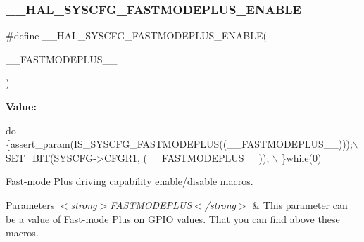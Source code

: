 \subsubsection{\texorpdfstring{\+\_\+\+\_\+\+H\+A\+L\+\_\+\+S\+Y\+S\+C\+F\+G\+\_\+\+F\+A\+S\+T\+M\+O\+D\+E\+P\+L\+U\+S\+\_\+\+E\+N\+A\+B\+LE}{\_\_HAL\_SYSCFG\_FASTMODEPLUS\_ENABLE}}
{\footnotesize\ttfamily \#define \+\_\+\+\_\+\+H\+A\+L\+\_\+\+S\+Y\+S\+C\+F\+G\+\_\+\+F\+A\+S\+T\+M\+O\+D\+E\+P\+L\+U\+S\+\_\+\+E\+N\+A\+B\+LE(\begin{DoxyParamCaption}\item[{}]{\+\_\+\+\_\+\+F\+A\+S\+T\+M\+O\+D\+E\+P\+L\+U\+S\+\_\+\+\_\+ }\end{DoxyParamCaption})}

{\bfseries Value\+:}
\begin{DoxyCode}
\textcolor{keywordflow}{do} \{assert\_param(IS\_SYSCFG\_FASTMODEPLUS((\_\_FASTMODEPLUS\_\_)));\(\backslash\)
                                                                SET\_BIT(SYSCFG->CFGR1, (\_\_FASTMODEPLUS\_\_));
      \(\backslash\)
                                                               \}\textcolor{keywordflow}{while}(0)
\end{DoxyCode}


Fast-\/mode Plus driving capability enable/disable macros. 


\begin{DoxyParams}{Parameters}
{\em $<$strong$>$\+F\+A\+S\+T\+M\+O\+D\+E\+P\+L\+U\+S$<$/strong$>$} & This parameter can be a value of \hyperlink{group___s_y_s_c_f_g___fast_mode_plus___g_p_i_o}{Fast-\/mode Plus on G\+P\+IO} values. That you can find above these macros. \\
\hline
\end{DoxyParams}
